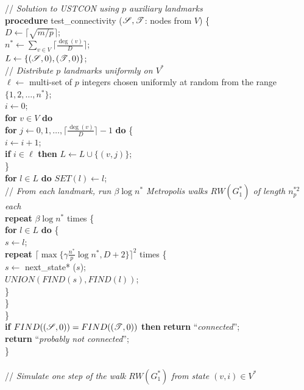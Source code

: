 \documentclass[11pt,a4paper]{article}
\newcommand{\s}{\ensuremath  \mathscr S}
\renewcommand{\t}{\ensuremath \mathscr  T}
\renewcommand{\*}{\hspace*{5mm}}
\begin{document}
\medskip
\noindent
// \emph{Solution to USTCON using $p$ auxiliary landmarks}\\
\textbf{procedure} test\_connectivity ($\s,\t$: nodes from $V$) \{\\
\* $D \gets \lceil \sqrt{m / p} \rceil$;\\
\* $n^* \gets \sum_{v \in V} \lceil \frac{\deg(v)}{D}\rceil$;\\
\* $L \gets \{(\s,0),(\t,0)\}$;\\[2mm]
\* // \emph{Distribute $p$ landmarks uniformly on $V^*$}\\
\* $\ell \gets$ multi-set of $p$ integers chosen uniformly at random from the range $\{1,2,\ldots,n^*\}$;\\
\* $i \gets 0$;\\
\* \textbf{for} $v\in V$ \textbf{do}\\
\* \* \textbf{for} $j \gets 0,1,\ldots, \lceil \frac{\deg(v)}{D}\rceil-1$ \textbf{do} \{\\
\* \* \* $i \gets i+1$;\\
\* \* \* \textbf{if} $i \in \ell$ \textbf{then} $L \gets L \cup \{(v, j)\}$;\\
\* \* \}\\
\* \textbf{for} $l\in L$ \textbf{do} $SET(l) \gets l$;\\[2mm]
\* // \emph{From each landmark, run $\beta \log n^*$ Metropolis walks $RW(G^{*}_1)$ of length $n_p^{*2}$ each}\\
\* \textbf{repeat} $\beta \log n^*$ times \{\\
\* \* \textbf{for} $l\in L$ \textbf{do} \{\\
\* \* \* $s \gets l$; \\
\* \* \* \textbf{repeat} $\lceil \max\{ \gamma \frac{n^*}{p} \log n^*, D+2\} \rceil^{2}$ times \{\\
\* \* \* \* $s \gets$ next\_state* ($s$);\\
\* \* \* \* $UNION (FIND(s), FIND(l))$;\\
\* \* \* \}\\
\* \* \}\\
\* \}\\
\* \textbf{if} $FIND((\s,0)) = FIND((\t,0))$ \textbf{then} \textbf{return} ``\emph{connected}'';\\
\* \textbf{return} ``\emph{probably not connected}'';\\
\}\\
\\
// \emph{Simulate one step of the walk $RW({G^{*}_1})$ from state $(v,i)\in V^*$}\\
\end{document}
